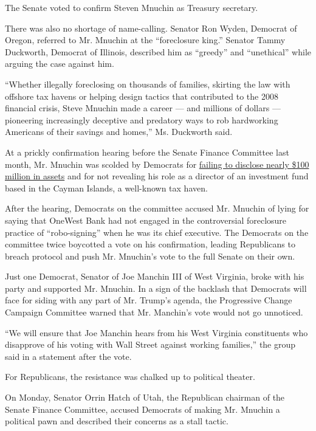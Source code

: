 The Senate voted to confirm Steven Mnuchin as Treasury secretary.

There was also no shortage of name-calling. Senator Ron Wyden, Democrat
of Oregon, referred to Mr. Mnuchin at the ``foreclosure king.'' Senator
Tammy Duckworth, Democrat of Illinois, described him as ``greedy'' and
``unethical'' while arguing the case against him.

``Whether illegally foreclosing on thousands of families, skirting the
law with offshore tax havens or helping design tactics that contributed
to the 2008 financial crisis, Steve Mnuchin made a career --- and
millions of dollars --- pioneering increasingly deceptive and predatory
ways to rob hardworking Americans of their savings and homes,'' Ms.
Duckworth said.

At a prickly confirmation hearing before the Senate Finance Committee
last month, Mr. Mnuchin was scolded by Democrats for
\href{https://www.nytimes.com/2017/01/19/us/politics/steven-mnuchin-treasury-secretary-nominee-assets-confirmation.html}{failing
to disclose nearly \$100 million in assets} and for not revealing his
role as a director of an investment fund based in the Cayman Islands, a
well-known tax haven.

After the hearing, Democrats on the committee accused Mr. Mnuchin of
lying for saying that OneWest Bank had not engaged in the controversial
foreclosure practice of ``robo-signing'' when he was its chief
executive. The Democrats on the committee twice boycotted a vote on his
confirmation, leading Republicans to breach protocol and push Mr.
Mnuchin's vote to the full Senate on their own.

Just one Democrat, Senator of Joe Manchin III of West Virginia, broke
with his party and supported Mr. Mnuchin. In a sign of the backlash that
Democrats will face for siding with any part of Mr. Trump's agenda, the
Progressive Change Campaign Committee warned that Mr. Manchin's vote
would not go unnoticed.

``We will ensure that Joe Manchin hears from his West Virginia
constituents who disapprove of his voting with Wall Street against
working families,'' the group said in a statement after the vote.

For Republicans, the resistance was chalked up to political theater.

On Monday, Senator Orrin Hatch of Utah, the Republican chairman of the
Senate Finance Committee, accused Democrats of making Mr. Mnuchin a
political pawn and described their concerns as a stall tactic.

